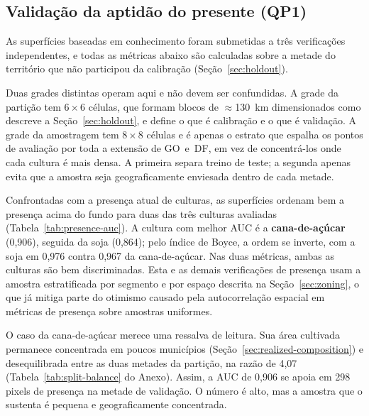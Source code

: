 \begin{table}[htbp]
\centering
\caption{Lacuna entre potencial e uso atual: parcela de todo o território de GO~e~DF que
é apta (S2+) para um segmento, mas não está atualmente sob esse uso.}
\label{tab:pot-real-gap}

\end{table}

\subsection{Validação da aptidão do presente (QP1)}\label{sec:validation-present}

As superfícies baseadas em conhecimento foram submetidas a três verificações independentes, e
todas as métricas abaixo são calculadas sobre a metade do território que não participou da
calibração (Seção~\ref{sec:holdout}).

Duas grades distintas operam aqui e não devem ser confundidas. A grade da partição tem
$6 \times 6$ células, que formam blocos de $\approx$130~km dimensionados como descreve a
Seção~\ref{sec:holdout}, e define o que é calibração e o que é validação. A grade da amostragem tem
$8 \times 8$ células e é apenas o estrato que espalha os pontos de avaliação por toda a extensão de
GO~e~DF, em vez de concentrá-los onde cada cultura é mais densa. A primeira separa treino de teste; a
segunda apenas evita que a amostra seja geograficamente enviesada dentro de cada metade.

Confrontadas com a presença atual de culturas, as superfícies ordenam bem a presença acima do fundo
para duas das três culturas avaliadas (Tabela~\ref{tab:presence-auc}). A cultura com melhor AUC é a
\textbf{cana-de-açúcar} (0,906), seguida da soja (0,864); pelo índice de Boyce, a ordem se inverte,
com a soja em 0,976 contra 0,967 da cana-de-açúcar. Nas duas métricas, ambas as culturas são bem
discriminadas. Esta e as demais verificações de presença usam a amostra estratificada por segmento e
por espaço descrita na Seção~\ref{sec:zoning}, o que já mitiga parte do otimismo causado pela
autocorrelação espacial em métricas de presença sobre amostras uniformes.

O caso da cana-de-açúcar merece uma ressalva de leitura. Sua área cultivada
permanece concentrada em poucos municípios (Seção~\ref{sec:realized-composition}) e desequilibrada
entre as duas metades da partição, na razão de 4,07 (Tabela~\ref{tab:split-balance} do Anexo).
Assim, a AUC de 0,906 se apoia em 298 pixels de presença na metade de validação. O número é alto,
mas a amostra que o sustenta é pequena e geograficamente concentrada.


